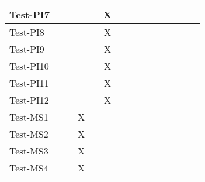 \documentclass[12pt, titlepage]{article}
\begin{document}
\begin{table}[H]
\begin{adjustwidth}{-0.3in}{-0.5in}
{\begin{tabular}{c|c|c|c|c|c|c|c|c|c|c|c|c|c|c|}
\multicolumn{1}{|l|}{{Test-PI7}}   &             &             &             &             &     X        &             &             &             &              &              &              &             &  &                    \\ \hline
\multicolumn{1}{|l|}{{Test-PI8}}   &             &             &             &             &     X        &             &             &             &              &              &              &             &  &                    \\ \hline
\multicolumn{1}{|l|}{{Test-PI9}}   &             &             &             &             &     X        &             &             &             &              &              &              &             &  &                    \\ \hline
\multicolumn{1}{|l|}{{Test-PI10}}   &             &             &             &             &     X        &             &             &             &              &              &              &             &  &                    \\ \hline
\multicolumn{1}{|l|}{{Test-PI11}}   &             &             &             &             &     X        &             &             &             &              &              &              &             &  &                    \\ \hline
\multicolumn{1}{|l|}{{Test-PI12}}   &             &             &             &             &     X        &             &             &             &              &              &              &             &  &                    \\ \hline
\multicolumn{1}{|l|}{{Test-MS1}}   &             &             &   X          &             &             &             &             &             &              &              &              &             &  &                    \\ \hline
\multicolumn{1}{|l|}{{Test-MS2}}   &             &             &         X    &             &             &             &             &             &              &              &              &             &  &                    \\ \hline
\multicolumn{1}{|l|}{{Test-MS3}}   &             &             &      X       &             &             &             &             &             &              &              &              &             &  &                    \\ \hline
\multicolumn{1}{|l|}{{Test-MS4}}   &             &             &      X       &             &             &             &             &             &              &              &              &             &  &                    \\ \hline

\end{tabular}}
\end{adjustwidth}
\end{table}
\end{document}
